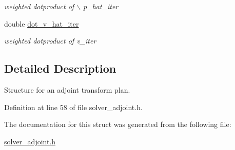 \begin{CompactItemize}
\begin{CompactList}\small\item\em weighted dotproduct of $\backslash$ p\_\-hat\_\-iter \item\end{CompactList}\item 
\hypertarget{structinfsft__adjoint__plan_o17}{
double \hyperlink{structinfsft__adjoint__plan_o17}{dot\_\-v\_\-hat\_\-iter}}
\label{structinfsft__adjoint__plan_o17}

\begin{CompactList}\small\item\em weighted dotproduct of v\_\-iter \item\end{CompactList}\end{CompactItemize}


\subsection{Detailed Description}
Structure for an adjoint transform plan. 



Definition at line 58 of file solver\_\-adjoint.h.

The documentation for this struct was generated from the following file:\begin{CompactItemize}
\item 
\hyperlink{solver__adjoint_8h}{solver\_\-adjoint.h}\end{CompactItemize}
